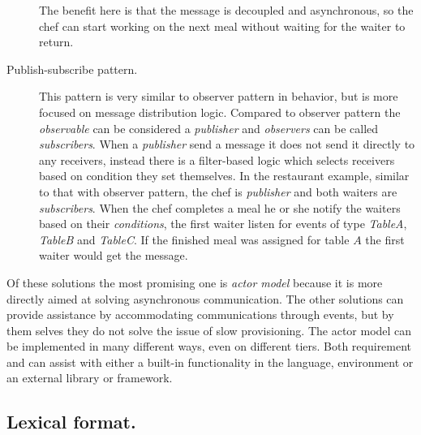 \begin{description}
    The benefit here is that the message is decoupled and asynchronous, so the chef can start
    working on the next meal without waiting for the waiter to return.
  \item[Publish-subscribe pattern.] This pattern is very similar to observer pattern in behavior,
    but is more focused on message distribution logic.
    Compared to observer pattern the \emph{observable} can be considered a \emph{publisher} and
    \emph{observers} can be called \emph{subscribers}.
    When a \emph{publisher} send a message it does not send it directly to any receivers,
    instead there is a filter-based logic which selects receivers based on condition they set themselves.
    In the restaurant example, similar to that with observer pattern, the chef is \emph{publisher}
    and both waiters are \emph{subscribers}.
    When the chef completes a meal he or she notify the waiters based on their \emph{conditions},
    \eg the first waiter listen for events of type \emph{TableA}, \emph{TableB} and \emph{TableC}.
    If the finished meal was assigned for table $A$ the first waiter would get the message.
\end{description}
Of these solutions the most promising one is \emph{actor model} because it is more directly aimed
at solving asynchronous communication.
The other solutions can provide assistance by accommodating communications through events, 
but by them selves they do not solve the issue of slow provisioning.
The actor model can be implemented in many different ways, even on different tiers.
Both requirement  and  can assist with either
a built-in functionality in the language, environment or an external library or framework.

\subsection{Lexical format.}

